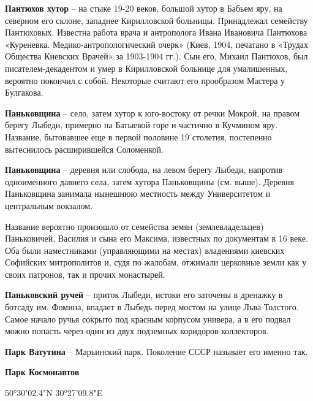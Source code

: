\medskip

\textbf{Пантюхов хутор} – на стыке 19-20 веков, большой хутор в Бабьем яру, на северном его склоне, западнее Кирилловской больницы. Принадлежал семейству Пантюховых. Известна работа врача и антрополога Ивана Ивановича Пантюхова «Куреневка. Медико-антропологи\-ческий очерк» (Киев, 1904, печатано в «Трудах Общества Киевских Врачей» за 1903-1904 гг.). Сын его, Михаил Пантюхов, был писателем-декадентом и умер в Кирилловской больнице для умалишенных, вероятно покончил с собой. Некоторые считают его прообразом Мастера у Булгакова.\\

\medskip

\textbf{Паньковщина} – село, затем хутор к юго-востоку от речки Мокрой, на правом берегу Лыбеди, примерно на Батыевой горе и частично в Кучмином яру. Название, бытовавшее еще в первой половине 19 столетия, постепенно вытеснилось расширившейся Соломенкой.\\

\medskip

\textbf{Паньковщина} – деревня или слобода, на левом берегу Лыбеди, напротив одноименного давнего села, затем хутора Паньковщины (см. выше). Деревня Паньковщина занимала нынешнюю местность между Университетом и центральным вокзалом.

Название вероятно произошло от семейства земян (землевладельцев) Паньковичей, Василия и сына его Максима, известных по документам в 16 веке. Оба были наместниками (управляющими на местах) владениями киевских Софийских митрополитов и, судя по жалобам, отжимали церковные земли как у своих патронов, так и прочих монастырей.\\

\medskip

\textbf{Паньковский ручей} – приток Лыбеди, истоки его заточены в дренажку в ботсаду им. Фомина, впадает в Лыбедь перед мостом на улице Льва Толстого. Самое начало ручья сокрыто под красным корпусом универа, а в его подвал можно попасть через один из двух подземных коридоров-коллекторов.\\

\medskip

\textbf{Парк Ватутина} – Марьинский парк. Поколение СССР называет его именно так.\\

\newpage

\textbf{Парк Космонавтов}

50°30'02.4"N 30°27'09.8"E

